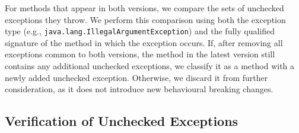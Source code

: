 For methods that appear in both versions, we compare the sets of unchecked exceptions they throw. We perform this comparison using both the exception type (e.g., \texttt{java.lang.IllegalArgumentException}) and the fully qualified signature of the method in which the exception occurs. If, after removing all exceptions common to both versions, the method in the latest version still contains any additional unchecked exceptions, we classify it as a method with a newly added unchecked exception. Otherwise, we discard it from further consideration, as it does not introduce new behavioural breaking changes.

\subsection{Verification of Unchecked Exceptions}
